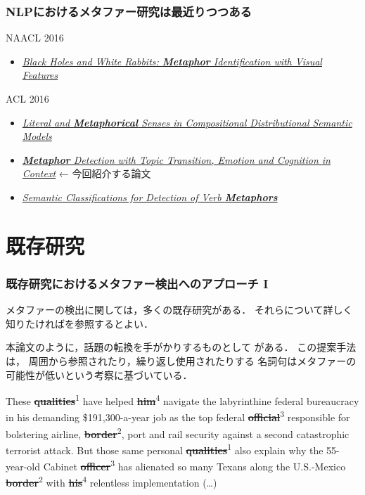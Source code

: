 \documentclass[11pt,usepdftitle=false]{beamer}
\newcommand\firstref[1]{\textcolor{sLightBlue}{\sout{\textbf{#1}}}\textsuperscript{1}}
\newcommand\secondref[1]{\textcolor{sPink}{\sout{\textbf{#1}}}\textsuperscript{2}}
\newcommand\thirdref[1]{\textcolor{sYellow}{\sout{\textbf{#1}}}\textsuperscript{3}}
\newcommand\fourthref[1]{\textcolor{sPurple}{\sout{\textbf{#1}}}\textsuperscript{4}}
\newcommand\stress[1]{\textcolor{sRed}{\textbf{#1}}}
\newcommand\papertitle[1]{\textit{#1}}
\let\oldcite=\citet
\renewcommand\citet[1]{\hyperlink{#1}{\oldcite{#1}}}
\begin{document}
\begin{frame}
  \frametitle{NLPにおけるメタファー研究は最近りつつある}
  NAACL 2016
  \begin{itemize}
      \item \href{http://aclanthology.info/papers/black-holes-and-white-rabbits-metaphor-identification-with-visual-features}{\papertitle{Black Holes and White Rabbits: \stress{Metaphor} Identification with Visual Features}}
  \end{itemize}
  ACL 2016
  \begin{itemize}
      \item \href{http://aclanthology.info/papers/literal-and-metaphorical-senses-in-compositional-distributional-semantic-models}{\papertitle{Literal and \stress{Metaphorical} Senses in Compositional Distributional Semantic Models}}
      \item \href{http://aclanthology.info/papers/metaphor-detection-with-topic-transition-emotion-and-cognition-in-context}{\papertitle{\stress{Metaphor} Detection with Topic Transition, Emotion and Cognition in Context}} ← 今回紹介する論文
      \item \href{http://aclanthology.info/papers/semantic-classifications-for-detection-of-verb-metaphors}{\papertitle{Semantic Classifications for Detection of Verb \stress{Metaphors}}}
  \end{itemize}
\end{frame}

\section{既存研究}
\begin{frame}
\frametitle{既存研究におけるメタファー検出へのアプローチ I}
    メタファーの検出に関しては，多くの既存研究がある．
    それらについて詳しく知りたければ\citet{veale2016}を参照するとよい．

    本論文のように，話題の転換を手がかりするものとして
    \citet{broadwell2013}がある．
    この提案手法は，
    周囲から参照されたり，繰り返し使用されたりする
    名詞句はメタファーの可能性が低いという考察に基づいている．

    \smallskip

    \begingroup
    \small
    \begin{leftbar}
        These \firstref{qualities}
        have helped \fourthref{him}
        navigate the labyrinthine federal bureaucracy in his demanding
        \$191,300-a-year job as the top federal \thirdref{official}
        responsible for bolstering airline, \secondref{border},
        port and rail security against a second catastrophic terrorist attack.
        But those same personal \firstref{qualities} also explain
        why the 55-year-old Cabinet \thirdref{officer} has alienated
        so many Texans along the U.S.-Mexico \secondref{border} with
        \fourthref{his} relentless implementation (…)
    \end{leftbar}
    \endgroup
\end{frame}
\end{document}
